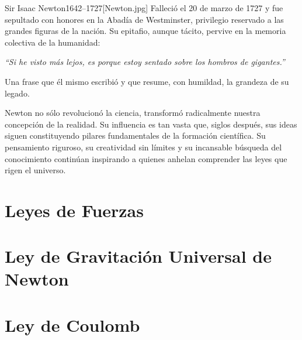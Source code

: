 \begin{semblanza}{Sir Isaac Newton}{1642–1727}[Newton.jpg]
    Falleció el 20 de marzo de 1727 y fue sepultado con honores en la Abadía de Westminster, privilegio reservado a las grandes figuras de la nación. Su epitafio, aunque tácito, pervive en la memoria colectiva de la humanidad:
    \begin{center}
        \textit{“Si he visto más lejos, es porque estoy sentado sobre los hombros de gigantes.”}
    \end{center}
    Una frase que él mismo escribió y que resume, con humildad, la grandeza de su legado.

    Newton no sólo revolucionó la ciencia, transformó radicalmente nuestra concepción de la realidad. Su influencia es tan vasta que, siglos después, sus ideas siguen constituyendo pilares fundamentales de la formación científica. Su pensamiento riguroso, su creatividad sin límites y su incansable búsqueda del conocimiento continúan inspirando a quienes anhelan comprender las leyes que rigen el universo.
\end{semblanza}

\section{Leyes de Fuerzas}

\section[Ley de Gravitación Universal]{Ley de Gravitación Universal de Newton}

\section{Ley de Coulomb}

